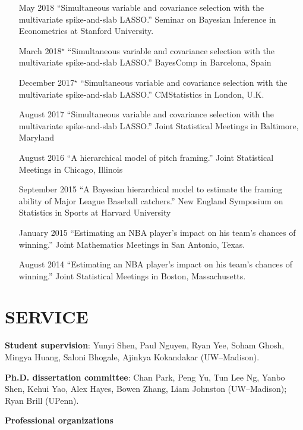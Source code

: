 \documentclass[margin]{res}
\begin{document}
\begin{resume}
{\begin{itemize}
\item[May 2018]{``Simultaneous variable and covariance selection with the multivariate spike-and-slab LASSO.'' Seminar on Bayesian Inference in Econometrics at Stanford University.}

\item[March 2018$^{\star}$]{``Simultaneous variable and covariance selection with the multivariate spike-and-slab LASSO.'' BayesComp in Barcelona, Spain}

\item[December 2017$^{\star}$]{``Simultaneous variable and covariance selection with the multivariate spike-and-slab LASSO.'' CMStatistics in London, U.K.}

\item[August 2017]{``Simultaneous variable and covariance selection with the multivariate spike-and-slab LASSO.'' Joint Statistical Meetings in Baltimore, Maryland}

\item[August 2016]{``A hierarchical model of pitch framing.'' Joint Statistical Meetings in Chicago, Illinois}

\item[September 2015]{``A Bayesian hierarchical model to estimate the framing ability of Major League Baseball catchers.'' New England Symposium on Statistics in Sports at Harvard University}

\item[January 2015]{``Estimating an NBA player's impact on his team's chances of winning.'' Joint Mathematics Meetings in San Antonio, Texas.}

\item[August 2014]{``Estimating an NBA player's impact on his team's chances of winning.'' Joint Statistical Meetings in Boston, Massachusetts.}

\end{itemize}
}
\section{SERVICE}

\textbf{Student supervision}: Yunyi Shen, Paul Nguyen, Ryan Yee, Soham Ghosh, Mingya Huang, Saloni Bhogale, Ajinkya Kokandakar (UW--Madison).

\textbf{Ph.D. dissertation committee}: Chan Park, Peng Yu, Tun Lee Ng, Yanbo Shen, Kehui Yao, Alex Hayes, Bowen Zhang, Liam Johnston (UW--Madison); Ryan Brill (UPenn).

\textbf{Professional organizations}


\end{resume}
\end{document}
